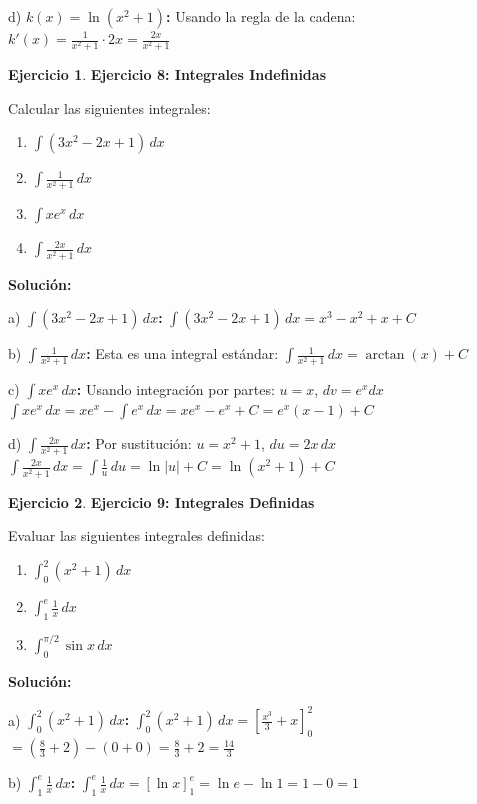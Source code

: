 \documentclass[12pt, a4paper, oneside]{book}
\theoremstyle{definition}
\newtheorem{ejercicio}{Ejercicio}[chapter]
\begin{document}
d) \textbf{$k(x) = \ln(x^2 + 1)$:}
Usando la regla de la cadena:
$k'(x) = \frac{1}{x^2 + 1} \cdot 2x = \frac{2x}{x^2 + 1}$

\begin{ejercicio}
\textbf{Ejercicio 8: Integrales Indefinidas}

Calcular las siguientes integrales:
\begin{enumerate}[label=\alph*)]
    \item $\int (3x^2 - 2x + 1) \, dx$
    \item $\int \frac{1}{x^2 + 1} \, dx$
    \item $\int x e^x \, dx$
    \item $\int \frac{2x}{x^2 + 1} \, dx$
\end{enumerate}
\end{ejercicio}

\textbf{Solución:}

a) \textbf{$\int (3x^2 - 2x + 1) \, dx$:}
$\int (3x^2 - 2x + 1) \, dx = x^3 - x^2 + x + C$

b) \textbf{$\int \frac{1}{x^2 + 1} \, dx$:}
Esta es una integral estándar:
$\int \frac{1}{x^2 + 1} \, dx = \arctan(x) + C$

c) \textbf{$\int x e^x \, dx$:}
Usando integración por partes: $u = x$, $dv = e^x dx$
$\int x e^x \, dx = x e^x - \int e^x \, dx = x e^x - e^x + C = e^x(x - 1) + C$

d) \textbf{$\int \frac{2x}{x^2 + 1} \, dx$:}
Por sustitución: $u = x^2 + 1$, $du = 2x \, dx$
$\int \frac{2x}{x^2 + 1} \, dx = \int \frac{1}{u} \, du = \ln|u| + C = \ln(x^2 + 1) + C$

\begin{ejercicio}
\textbf{Ejercicio 9: Integrales Definidas}

Evaluar las siguientes integrales definidas:
\begin{enumerate}[label=\alph*)]
    \item $\int_0^2 (x^2 + 1) \, dx$
    \item $\int_1^e \frac{1}{x} \, dx$
    \item $\int_0^{\pi/2} \sin x \, dx$
\end{enumerate}
\end{ejercicio}

\textbf{Solución:}

a) \textbf{$\int_0^2 (x^2 + 1) \, dx$:}
$\int_0^2 (x^2 + 1) \, dx = \left[\frac{x^3}{3} + x\right]_0^2$
$= \left(\frac{8}{3} + 2\right) - (0 + 0) = \frac{8}{3} + 2 = \frac{14}{3}$

b) \textbf{$\int_1^e \frac{1}{x} \, dx$:}
$\int_1^e \frac{1}{x} \, dx = [\ln x]_1^e = \ln e - \ln 1 = 1 - 0 = 1$
\end{document}
